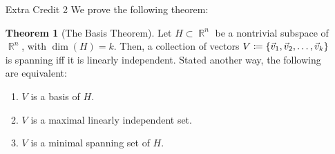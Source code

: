 \documentclass{amsart}
\theoremstyle{definition}
\newtheorem{theorem}[definition]{Theorem}
\theoremstyle{definition}
\DeclareMathOperator{\R}{\mathbb{R}}
\DeclareMathOperator{\1}{\mathbbm{1}}
\begin{document}
\begin{enumerate}[itemsep = 2mm]
\begin{proof}
\begin{enumerate}
				
				\item By the distributive property of matrix multiplication, we have
				\begin{align*}
				E_{i + k(j)} A = \begin{bmatrix} E_1 A  \\ \vdots \\ E_{i-1} A \\ (E_{i} + k E_{j})A \\ E_{i+1} A \\ \vdots \\ E_{j-1} A \\ E_j A \\ E_{j+1} A \\ \vdots \\ E_m A \end{bmatrix}
				= \begin{bmatrix} E_1 A  \\ \vdots \\ E_{i-1} A \\ E_{i}A + k E_{j}A \\ E_{i+1} A \\ \vdots \\ E_{j-1} A \\ E_j A \\ E_{j+1} A \\ \vdots \\ E_m A \end{bmatrix}
				\end{align*}
				from previous parts, we know $E_{i}A$ corresponds to row $i$ of matrix $A$, and $k E_{j}A$ to $k$ multiples of row $j$ of matrix $A$.
			\end{enumerate}
			Combining the three parts above concludes the proof.
		\end{proof}
		
		
		\item[Extra Credit 2] We prove the following theorem:
		
		\begin{theorem}[The Basis Theorem]
			\label{thmbasis}
			Let $H \subset \R^n$ be a nontrivial subspace of $\R^n$, with $\dim (H) = k$. Then, a collection of vectors $V \coloneqq \set{\vec{v}_1, \vec{v}_2, \dots, \vec{v}_k}$ is spanning iff it is linearly independent. Stated another way, the following are equivalent:
			\begin{enumerate}
				\item $V$ is a basis of $H$.
				\item $V$ is a maximal linearly independent set.
				\item $V$ is a minimal spanning set of $H$.
			\end{enumerate}
		\end{theorem}
	

\end{enumerate}
\end{document}
